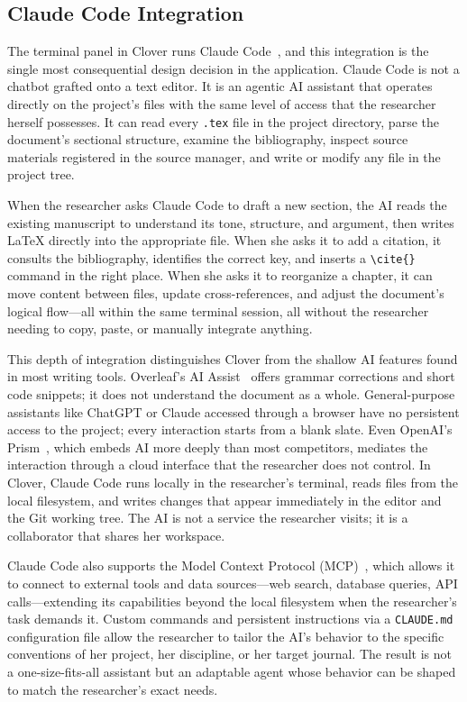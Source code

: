 \documentclass[a4paper,11pt]{article}
\begin{document}
\subsection{Claude Code Integration}

The terminal panel in Clover runs Claude Code~\cite{ClaudeCode}, and this integration is the single most consequential design decision in the application. Claude Code is not a chatbot grafted onto a text editor. It is an agentic AI assistant that operates directly on the project's files with the same level of access that the researcher herself possesses. It can read every \texttt{.tex} file in the project directory, parse the document's sectional structure, examine the bibliography, inspect source materials registered in the source manager, and write or modify any file in the project tree.

When the researcher asks Claude Code to draft a new section, the AI reads the existing manuscript to understand its tone, structure, and argument, then writes \LaTeX{} directly into the appropriate file. When she asks it to add a citation, it consults the bibliography, identifies the correct key, and inserts a \texttt{\textbackslash cite\{\}} command in the right place. When she asks it to reorganize a chapter, it can move content between files, update cross-references, and adjust the document's logical flow---all within the same terminal session, all without the researcher needing to copy, paste, or manually integrate anything.

This depth of integration distinguishes Clover from the shallow AI features found in most writing tools. Overleaf's AI Assist~\cite{Overleaf} offers grammar corrections and short code snippets; it does not understand the document as a whole. General-purpose assistants like ChatGPT or Claude accessed through a browser have no persistent access to the project; every interaction starts from a blank slate. Even OpenAI's Prism~\cite{OpenAIPrism}, which embeds AI more deeply than most competitors, mediates the interaction through a cloud interface that the researcher does not control. In Clover, Claude Code runs locally in the researcher's terminal, reads files from the local filesystem, and writes changes that appear immediately in the editor and the Git working tree. The AI is not a service the researcher visits; it is a collaborator that shares her workspace.

Claude Code also supports the Model Context Protocol (MCP)~\cite{ClaudeCode}, which allows it to connect to external tools and data sources---web search, database queries, API calls---extending its capabilities beyond the local filesystem when the researcher's task demands it. Custom commands and persistent instructions via a \texttt{CLAUDE.md} configuration file allow the researcher to tailor the AI's behavior to the specific conventions of her project, her discipline, or her target journal. The result is not a one-size-fits-all assistant but an adaptable agent whose behavior can be shaped to match the researcher's exact needs.
\end{document}
